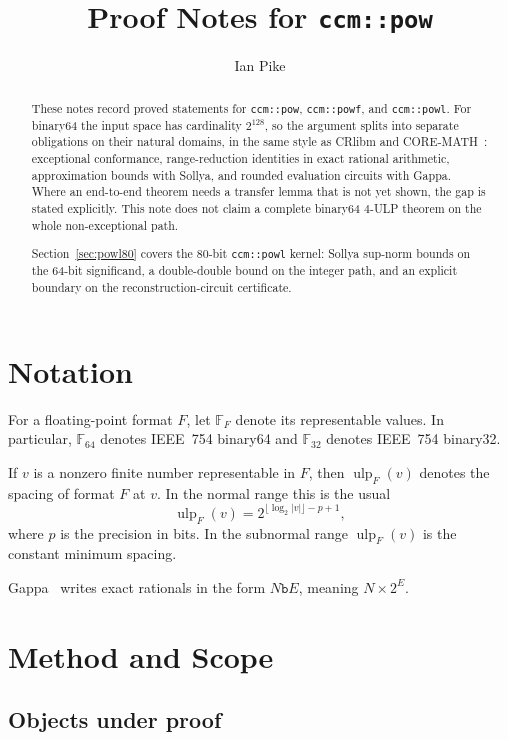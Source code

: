 \documentclass[11pt]{article}
\title{\textbf{Proof Notes for \texttt{ccm::pow}}}
\author{Ian Pike}
\date{}
\theoremstyle{plain}
\theoremstyle{remark}
\newcommand{\ulp}{\operatorname{ulp}}
\newcommand{\Pow}{\texttt{ccm::pow}}
\newcommand{\Powf}{\texttt{ccm::powf}}
\newcommand{\Powl}{\texttt{ccm::powl}}
\begin{document}
\maketitle
\thispagestyle{empty}

\begin{abstract}
These notes record proved statements for \Pow, \Powf, and \Powl.  For binary64
the input space has cardinality $2^{128}$, so the argument splits into separate
obligations on their natural domains, in the same style as CRlibm and
CORE-MATH~\cite{powr,coremath}: exceptional conformance, range-reduction
identities in exact rational arithmetic, approximation bounds with Sollya, and
rounded evaluation circuits with Gappa.  Where an end-to-end theorem needs a
transfer lemma that is not yet shown, the gap is stated explicitly.  This note
does not claim a complete binary64 $4$-ULP theorem on the whole non-exceptional
path.

Section~\ref{sec:powl80} covers the 80-bit \Powl{} kernel: Sollya sup-norm
bounds on the 64-bit significand, a double-double bound on the integer path,
and an explicit boundary on the reconstruction-circuit certificate.
\end{abstract}

\tableofcontents
\newpage

\section*{Notation}

For a floating-point format $F$, let $\mathbb{F}_F$ denote its representable
values.  In particular, $\mathbb{F}_{64}$ denotes IEEE~754 binary64 and
$\mathbb{F}_{32}$ denotes IEEE~754 binary32.

If $v$ is a nonzero finite number representable in $F$, then $\ulp_F(v)$
denotes the spacing of format $F$ at $v$.  In the normal range this is the
usual
\[
  \ulp_F(v) = 2^{\lfloor \log_2 |v| \rfloor - p + 1},
\]
where $p$ is the precision in bits.  In the subnormal range $\ulp_F(v)$ is
the constant minimum spacing.

Gappa~\cite{gappa} writes exact rationals in the form $N\mathtt{b}E$, meaning
$N \times 2^E$.

\section{Method and Scope}
\label{sec:scope}

\subsection{Objects under proof}
\end{document}
